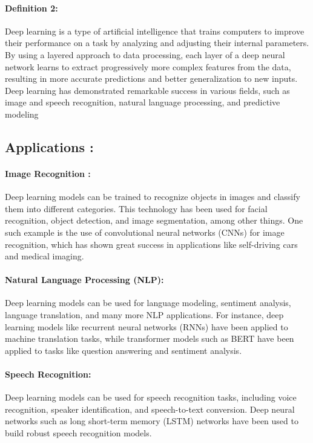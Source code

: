 			\paragraph{Definition 2:}
			Deep learning is a type of artificial intelligence that trains computers to improve their performance on a task by analyzing and adjusting their internal parameters. By using a layered approach to data processing, each layer of a deep neural network learns to extract progressively more complex features from the data, resulting in more accurate predictions and better generalization to new inputs. Deep learning has demonstrated remarkable success in various fields, such as image and speech recognition, natural language processing, and predictive modeling  \cite{lecun2015deep}
			
	\subsection{Applications :}
			\paragraph{Image Recognition :}
				Deep learning models can be trained to recognize objects in images and classify them into different categories. This technology has been used for facial recognition, object detection, and image segmentation, among other things. One such example is the use of convolutional neural networks (CNNs) for image recognition, which has shown great success in applications like self-driving cars and medical imaging. \cite{krizhevsky2017imagenet}
			
			\paragraph{Natural Language Processing (NLP):}
				Deep learning models can be used for language modeling, sentiment analysis, language translation, and many more NLP applications. For instance, deep learning models like recurrent neural networks (RNNs) have been applied to machine translation tasks, while transformer models such as BERT have been applied to tasks like question answering and sentiment analysis.  \cite{vaswani2017attention}
			\paragraph{Speech Recognition: }
				Deep learning models can be used for speech recognition tasks, including voice recognition, speaker identification, and speech-to-text conversion. Deep neural networks such as long short-term memory (LSTM) networks have been used to build robust speech recognition models. \cite{graves2005framewise}
			
